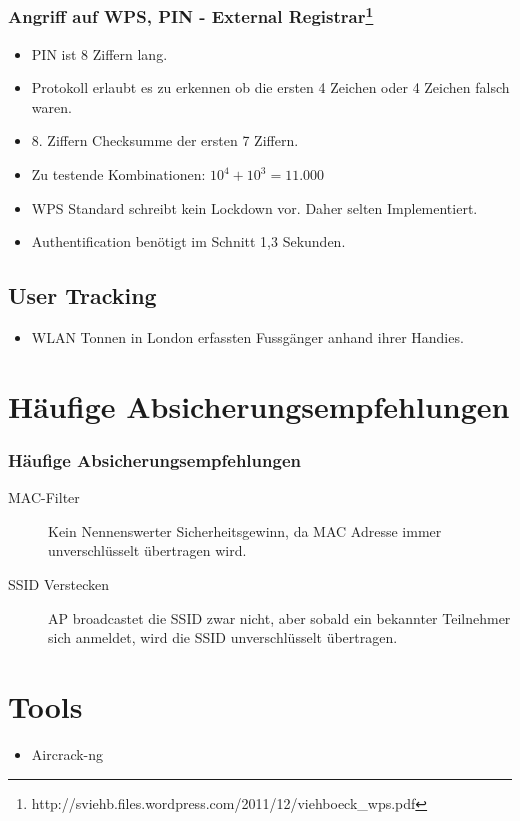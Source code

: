 \documentclass{beamer}
\begin{document}
\begin{frame}
\frametitle{Angriff auf WPS, PIN - External Registrar\footnote{http://sviehb.files.wordpress.com/2011/12/viehboeck\_wps.pdf}}
\begin{itemize}
	\item PIN ist 8 Ziffern lang.
	\item Protokoll erlaubt es zu erkennen ob die ersten 4 Zeichen oder 4 Zeichen falsch waren.
	\item 8. Ziffern Checksumme der ersten 7 Ziffern.
	\item Zu testende Kombinationen: $10^4+10^3 = 11.000$
	\item WPS Standard schreibt kein Lockdown vor. Daher selten Implementiert.
	\item Authentification benötigt im Schnitt 1,3 Sekunden.
\end{itemize}
\end{frame}

\subsection{User Tracking}
\begin{frame}
\begin{itemize}
	\item WLAN Tonnen in London erfassten Fussgänger anhand ihrer Handies.
\end{itemize}
\end{frame}

\section{Häufige Absicherungsempfehlungen}
\begin{frame}
\frametitle{Häufige Absicherungsempfehlungen}
\begin{description}
	\item[MAC-Filter] Kein Nennenswerter Sicherheitsgewinn, da MAC Adresse immer unverschlüsselt übertragen wird.
	\item[SSID Verstecken] AP broadcastet die SSID zwar nicht, aber sobald ein bekannter Teilnehmer sich anmeldet, wird die SSID unverschlüsselt übertragen.
\end{description}
\end{frame}

\section{Tools}
\begin{frame}
\begin{itemize}
	\item Aircrack-ng
\end{itemize}
\end{frame}
\end{document}
